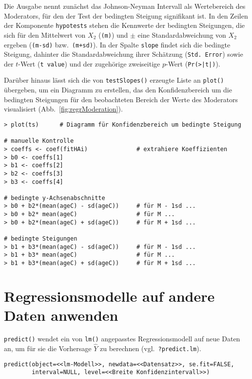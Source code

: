 Die Ausgabe nennt zunächst das Johnson-Neyman Intervall als Wertebereich des Moderators, für den der Test der bedingten Steigung signifikant ist. In den Zeilen der Komponente \lstinline!hypotests! stehen die Kennwerte der bedingten Steigungen, die sich für den Mittelwert von $X_{2}$ (\lstinline!(m)!) und $\pm$ eine Standardabweichung von $X_{2}$ ergeben (\lstinline!(m-sd)! bzw.\ \lstinline!(m+sd)!). In der Spalte \lstinline!slope! findet sich die bedingte Steigung, dahinter die Standardabweichung ihrer Schätzung (\lstinline!Std. Error!) sowie der $t$-Wert (\lstinline!t value!) und der zugehörige zweiseitige $p$-Wert (\lstinline!Pr(>|t|)!).

Darüber hinaus lässt sich die von \lstinline!testSlopes()! erzeugte Liste an \lstinline!plot()! übergeben, um ein Diagramm zu erstellen, das den Konfidenzbereich um die bedingten Steigungen für den beobachteten Bereich der Werte des Moderators visualisiert (Abb.\ \ref{fig:regrModeration}).
\begin{lstlisting}
> plot(ts)      # Diagramm für Konfidenzbereich um bedingte Steigung

# manuelle Kontrolle
> coeffs <- coef(fitHAi)              # extrahiere Koeffizienten
> b0 <- coeffs[1]
> b1 <- coeffs[2]
> b2 <- coeffs[3]
> b3 <- coeffs[4]

# bedingte y-Achsenabschnitte
> b0 + b2*(mean(ageC) - sd(ageC))     # für M - 1sd ...
> b0 + b2* mean(ageC)                 # für M ...
> b0 + b2*(mean(ageC) + sd(ageC))     # für M + 1sd ...

# bedingte Steigungen
> b1 + b3*(mean(ageC) - sd(ageC))     # für M - 1sd ...
> b1 + b3* mean(ageC)                 # für M ...
> b1 + b3*(mean(ageC) + sd(ageC))     # für M + 1sd ...
\end{lstlisting}

\section{Regressionsmodelle auf andere Daten anwenden}
\label{sec:predict}

\lstinline!predict()! wendet ein von \lstinline!lm()! angepasstes Regressionsmodell auf neue Daten an, um für sie die Vorhersage $\hat{Y}$ zu berechnen (vgl.\ \lstinline!?predict.lm!).
\begin{lstlisting}
predict(object=<<lm-Modell>>, newdata=<<Datensatz>>, se.fit=FALSE,
        interval=NULL, level=<<Breite Konfidenzintervall>>)
\end{lstlisting}

